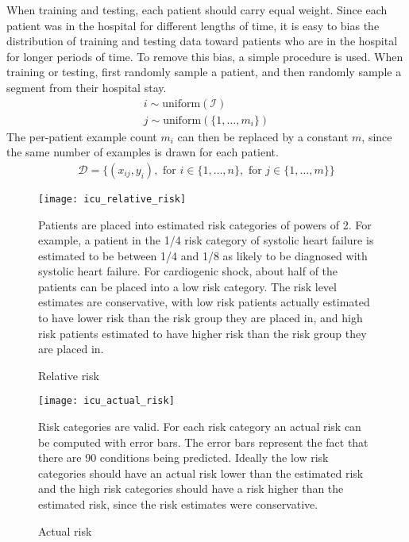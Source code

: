 When training and testing, each patient should carry equal weight.  Since each patient was in the hospital for different lengths of time, it is easy to bias the distribution of training and testing data toward patients who are in the hospital for longer periods of time.  To remove this bias, a simple procedure is used.  When training or testing, first randomly sample a patient, and then randomly sample a segment from their hospital stay.
\begin{gather}
    i \sim \text{uniform}(\mathcal{I}) \\
    j \sim \text{uniform}(\{1, \dots, m_i\})
\end{gather}
The per-patient example count $m_i$ can then be replaced by a constant $m$, since the same number of examples is drawn for each patient.
\begin{gather}
    \mathcal{D} = \{
        (x_{ij}, y_i),
        \text{ for } i \in \{ 1, \dots, n \},
        \text{ for } j \in \{ 1, \dots, m \}
    \}
\end{gather}

\begin{figure}
\texttt{[image: icu\_relative\_risk]}
\caption{Relative risk}
\vspace{12px}
Patients are placed into estimated risk categories of powers of 2.  For example, a patient in the 1/4 risk category of systolic heart failure is estimated to be between 1/4 and 1/8 as likely to be diagnosed with systolic heart failure.  For cardiogenic shock, about half of the patients can be placed into a low risk category.  The risk level estimates are conservative, with low risk patients actually estimated to have lower risk than the risk group they are placed in, and high risk patients estimated to have higher risk than the risk group they are placed in.
\label{fig:icu_relative_risk}
\end{figure}

\begin{figure}
\texttt{[image: icu\_actual\_risk]}
\caption{Actual risk}
\vspace{12px}
Risk categories are valid.  For each risk category an actual risk can be computed with error bars.  The error bars represent the fact that there are 90 conditions being predicted.  Ideally the low risk categories should have an actual risk lower than the estimated risk and the high risk categories should have a risk higher than the estimated risk, since the risk estimates were conservative.
\label{fig:icu_actual_risk}
\end{figure}

